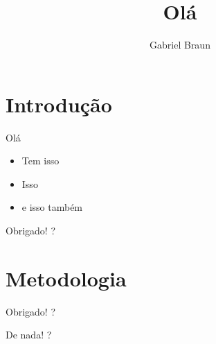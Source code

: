 \documentclass{braunpres}
\title{Olá}
\author{Gabriel Braun}
\affiliation{Colégio e Curso Pensi, Coordenação de Química}
\begin{document}
\maketitle

\tableofcontents

\section{Introdução}

\begin{frame}{Olá}
\begin{itemize}
\tightlist
\item
  Tem isso
\item
  Isso
\item
  e isso também
\end{itemize}
\end{frame}

\begin{frame}{Obrigado!}
?
\end{frame}

\section{Metodologia}

\begin{frame}{Obrigado!}
?
\end{frame}

\begin{frame}{De nada!}
?
\end{frame}
\end{document}
